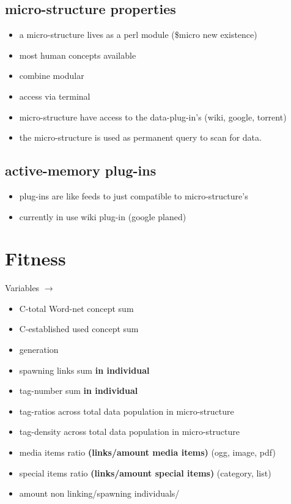 \documentclass[15pt]{article}
\begin{document}
\subsection{micro-structure properties}


\begin{itemize}
\item a micro-structure lives as a perl module (\$micro new existence)
\item most human concepts available
\item combine modular
\item access via terminal
\item micro-structure have access to the data-plug-in's (wiki, google, torrent)
\item the micro-structure is used as permanent query to scan for data.
\end{itemize}


\subsection{active-memory plug-ins}

\begin{itemize}
\item plug-ins are like feeds to just compatible to micro-structure's
\item currently in use wiki plug-in (google planed)
 

\end{itemize}



\vskip 2cm


\section{Fitness}  
  
Variables $\rightarrow$   

\begin{itemize}
\item C-total Word-net concept sum
\item C-established used concept sum
\item generation 
\item spawning links sum \textbf{in individual}
\item tag-number sum \textbf{in individual}
\item tag-ratios across total data population in micro-structure
\item tag-density across total data population in micro-structure
\item media items ratio \textbf{(links/amount media items)} (ogg, image, pdf)
\item special items ratio \textbf{(links/amount special items)} (category, list)
\item amount non linking/spawning individuals/
\end{itemize}
\end{document}
